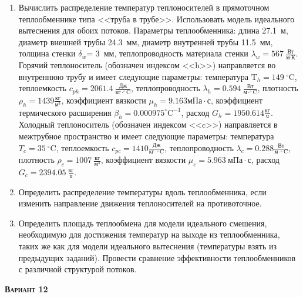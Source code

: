 \begin{enumerate} 
\item Вычислить распределение температур теплоносителей в прямоточном теплообменнике типа <<труба в трубе>>. Использовать модель идеального вытеснения для обоих потоков. Параметры теплообменника: длина  27.1~м, диаметр внешней трубы 24.3~мм,  диаметр внутренней трубы 11.5~мм, толщина стенки $\delta_{w}$=     3~мм,  теплопроводность материала стенки $\lambda_{w}=  567~\frac{\text{Вт}}{\text{м} \cdot \text{К}}$.  Горячий теплоноситель (обозначен индексом <<h>>) направляется во внутреннюю трубу и	 имеет следующие параметры: температура $\text{T}_{h}= 149~^\circ\mathrm{C}$, теплоемкость	  $c_{p{h}}= 2061.4~\frac{\text{Дж}}{\text{кг} \cdot ^\circ\mathrm{C}}$, теплопроводность 		$\lambda_{h}= 0.594~\frac{\text{Вт}}{\text{м} \cdot ^\circ\mathrm{C}}$, плотность 		$\rho_{h}= 1439 \frac{\text{кг}}{\text{м}^3}$, коэффициент вязкости $\mu_{h}=9.163 \text{мПа} 		\cdot \text{с} $, коэффициент термического расширения $\beta_{h}=0.000975 ^\circ\mathrm{C}^{-1}$,		 расход $G_{h}= 1950.614 \frac{\text{кг}}{\text{ч}}$. Холодный теплоноситель (обозначен индексом <<c>>) 		 направляется в межтрубное пространство и имеет следующие параметры: температура $T_{c}=   35		 ~^\circ\mathrm{C}$, теплоемкость $c_{p{c}}= 1410 \frac{\text{Дж}}{\text{кг} \cdot ^\circ\mathrm{C}}$,			 теплопроводность $\lambda_{c}=0.288 \frac{\text{Вт}}{\text{м} \cdot ^\circ\mathrm{C}}$, плотность 			 $\rho_{c}=  1007~\frac{\text{кг}}{\text{м}^3}$, коэффициент вязкости $\mu_{c}=5.963~\text{мПа} \cdot \text{с} $, 			 расход $G_{c}=2394.05~\frac{\text{кг}}{\text{ч}}$. 

\item Определить распределение температуры вдоль теплообменника, если 	изменить направление движения теплоносителей на противоточное.

\item Определить площадь теплообмена для модели идеального смешения, необходимую для достижения 	температур на выходе из теплообменника, таких же как для модели идеального вытеснения (температуры взять из предыдущих заданий).	Провести сравнение эффективности теплообменников с различной структурой потоков.

\end{enumerate}

\textsc{\textbf{Вариант 12}}

